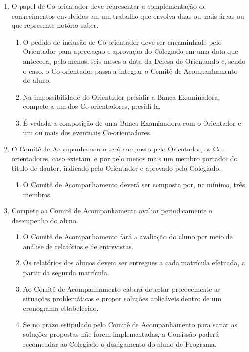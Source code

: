 \documentclass{article}
\begin{document}
\begin{enumerate}
	\item O papel de Co-orientador deve representar a complementação de conhecimentos envolvidos em um trabalho que envolva duas ou mais áreas ou que represente notório saber.
	\begin{enumerate}
		\item O pedido de inclusão de Co-orientador deve ser encaminhado pelo Orientador para apreciação e aprovação do Colegiado em uma data que anteceda, pelo menos, seis meses a data da Defesa do Orientando e, sendo o caso, o Co-orientador passa a integrar o Comitê de Acompanhamento do aluno.
		\item Na impossibilidade do Orientador presidir a Banca Examinadora, compete a um dos Co-orientadores, presidi-la.
		\item É vedada a composição de uma Banca Examinadora com o Orientador e um ou mais dos eventuais Co-orientadores.
	\end{enumerate}

	\item O Comitê de Acompanhamento será composto pelo Orientador, os Co-orientadores, caso existam, e por pelo menos mais um membro portador do título de doutor, indicado pelo Orientador e aprovado pelo Colegiado.
	\begin{enumerate}
		\item O Comitê de Acompanhamento deverá ser composta por, no mínimo, três membros.
	\end{enumerate}


	\item Compete ao Comitê de Acompanhamento avaliar periodicamente o desempenho do aluno.
	\begin{enumerate}
		\item O Comitê de Acompanhamento fará a avaliação do aluno por meio de análise de relatórios e de entrevistas.
		\item Os relatórios dos alunos devem ser entregues a cada matrícula efetuada, a partir da segunda matrícula.
		\item Ao Comitê de Acompanhamento caberá detectar precocemente as situações problemáticas e propor soluções aplicáveis dentro de um cronograma estabelecido.
		\item Se no prazo estipulado pelo Comitê de Acompanhamento para sanar as soluções propostas não forem implementadas, a Comissão poderá recomendar ao Colegiado o desligamento do aluno do Programa.
	\end{enumerate}

\end{enumerate}
\end{document}

